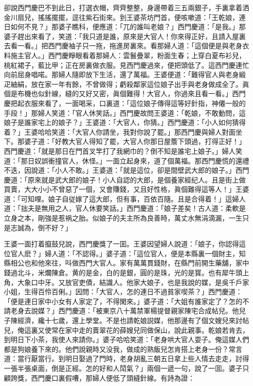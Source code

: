 卻說西門慶巴不到此日，打選衣帽，齊齊整整，身邊帶着三五兩銀子，手裏拿着洒金川扇兒，搖搖擺擺，逕往紫石街來。到王婆茶坊門首，便咳嗽道：「王乾娘，連日如何不見？」那婆子瞧科，便應道：「兀的誰叫老娘？」西門慶道：「是我。」那婆子趕出來看了，笑道：「我只道是誰，原來是大官人！你來得正好，且請入屋裏去看一看。」把西門慶袖子只一拖，拖進房裏來。看那婦人道：「這個便是與老身衣料施主官人。」西門慶睜眼看着那婦人：雲鬟疊翠，粉面生春；上穿白夏布衫兒，桃紅裙子，藍比甲；正在房裏做衣服。見西門慶過來，便把頭低了。這西門慶連忙向前屈身唱喏。那婦人隨即放下生活，還了萬福。王婆便道：「難得官人與老身緞疋紬絹，放在家一年有餘，不曾做得；虧殺鄰家這位娘子出手與老身做成全了。眞個是布機也似針線，縫的又好又密，眞個難得！大官人，你過來且看一看。」西門慶把起衣服來看了，一面喝采，口裏道：「這位娘子傳得這等好針指，神僊一般的手段！」那婦人笑道：「官人休笑話。」西門慶故問王婆道：「乾娘，不敢動問，這娘子是誰家宅上的娘子？」王婆道：「大官人，你猜。」西門慶道：「小人如何猜得着？」王婆哈哈笑道：「大官人你請坐，我對你說了罷。」那西門慶與婦人對面坐下。那婆子道：「好教大官人得知了罷，大官人你那日屋簷下頭過，打得正好！」西門慶道：「就是那日在門首叉竿打了我網巾的？倒不知是誰宅上娘子。」婦人笑道：「那日奴誤衝撞官人，休怪。」一面立起身來，道了個萬福。那西門慶慌的還禮不迭，因說道：「小人不敢。」王婆道：「就是這位，卻是間壁武大郎的娘子。」西門慶道：「原來就是武大郎的娘子！小人自認的大郎，是個養家經纪人。且是街上做買賣，大大小小不曾惡了一個，又會賺錢，又且好性格，眞個難得這等人！」王婆道：「可知哩。娘子自従嫁了這大郎，但有事，百依百隨。且是合得着！」這婦人道：「拙夫是無用之人，官人休要笑話。」西門慶道：「娘子差矣！古人道：柔軟是立身之本，剛強是惹祸之胎。似娘子的夫主所為良善時，萬丈水無涓滴漏，一生只是志誠為，倒不好？」

王婆一面打着攛鼓兒說，西門慶獎了一囬。王婆因望婦人說道：「娘子，你認得這位官人麽？」婦人道：「不認得。」婆子道：「這位官人，便是本縣裏一個財主，知縣相公也和他來往，呌做西門大官人。家有萬萬貫錢財，在縣門前開生藥舖，家中錢過北斗，米爛陳倉。黄的是金，白的是銀，圓的是珠，光的是寳。也有犀牛頭上角，大象口中牙。又放官吏債，結識人。他家大娘子，也是我說的媒，是吳千戶家小姐，生得百伶百俐。」因問：「大官人，怎的連日不過貧家喫茶？」西門慶道：「便是連日家中小女有人家定了，不得閑來。」婆子道：「大姐有誰家定了？怎的不請老身去說媒？」西門慶道：「被東京八十萬禁軍楊提督親家陳宅合成帖兒。他兒子陳經濟，纔十七歲，還上學堂。不是也請乾娘説媒，他那邊有了個文嫂兒來討帖兒，俺這裏又使常在家中走的賣翠花的薛嫂兒同做保山，說此親事。乾娘若肯去，到明日下小茶，我使人來請你。」婆子哈哈笑道：「老身哄大官人耍子。俺這媒人們都是狗娘養下來的。他們說親時又没我，做成的熟飯兒怎肯搭上老身一份？常言道：當行厭當行。到明日娶過了門時，老身胡亂三朝五日拿上些人情去走走，討得一張半張桌面，倒是正經。怎的好和人鬦氣？」兩個一遞一句，說了一囬。婆子只顧誇獎，西門慶口裏假嘈，那婦人便低了頭縫針線。有詩為證：


